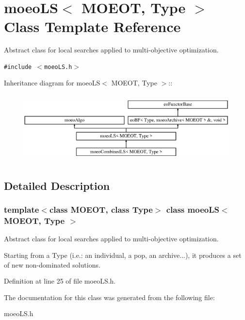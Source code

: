 \section{moeo\-LS$<$ MOEOT, Type $>$ Class Template Reference}
\label{classmoeoLS}
Abstract class for local searches applied to multi-objective optimization.  


{\tt \#include $<$moeo\-LS.h$>$}

Inheritance diagram for moeo\-LS$<$ MOEOT, Type $>$::\begin{figure}[H]
\begin{center}
\leavevmode
\includegraphics[height=3.69637cm]{classmoeoLS}
\end{center}
\end{figure}


\subsection{Detailed Description}
\subsubsection*{template$<$class MOEOT, class Type$>$ class moeo\-LS$<$ MOEOT, Type $>$}

Abstract class for local searches applied to multi-objective optimization. 

Starting from a Type (i.e.: an individual, a pop, an archive...), it produces a set of new non-dominated solutions. 



Definition at line 25 of file moeo\-LS.h.

The documentation for this class was generated from the following file:\begin{CompactItemize}
\item 
moeo\-LS.h\end{CompactItemize}
